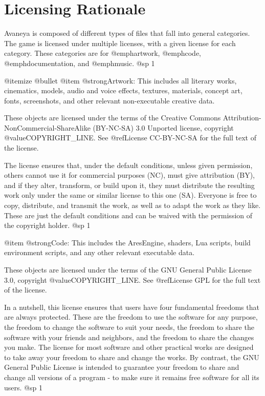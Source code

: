\chapter{Licensing Rationale}

Avaneya is composed of different types of files that fall into general categories. The game is licensed under multiple licenses, with a given license for each category. These categories are for @emph{artwork}, @emph{code}, @emph{documentation}, and @emph{music}.
@sp 1

@itemize @bullet
@item
@strong{Artwork:} This includes all literary works, cinematics, models, audio and voice effects, textures, materials, concept art, fonts, screenshots, and other relevant non-executable creative data. 

These objects are licensed under the terms of the Creative Commons Attribution-NonCommercial-ShareAlike (BY-NC-SA) 3.0 Unported license, copyright @value{COPYRIGHT_LINE}. See @ref{License CC-BY-NC-SA} for the full text of the license.

The license ensures that, under the default conditions, unless given permission, others cannot use it for commercial purposes (NC), must give attribution (BY), and if they alter, transform, or build upon it, they must distribute the resulting work only under the same or similar license to this one (SA). Everyone is free to copy, distribute, and transmit the work, as well as to adapt the work as they like. These are just the default conditions and can be waived with the permission of the copyright holder.
@sp 1

@item
@strong{Code:} This includes the AresEngine, shaders, Lua scripts, build environment scripts, and any other relevant executable data.

These objects are licensed under the terms of the GNU General Public License 3.0, copyright @value{COPYRIGHT_LINE}. See @ref{License GPL} for the full text of the license.

In a nutshell, this license ensures that users have four fundamental freedoms that are always protected. These are the freedom to use the software for any purpose, the freedom to change the software to suit your needs, the freedom to share the software with your friends and neighbors, and the freedom to share the changes you make. The license for most software and other practical works are designed to take away your freedom to share and change the works. By contrast, the GNU General Public License is intended to guarantee your freedom to share and change all versions of a program - to make sure it remains free software for all its users.
@sp 1

